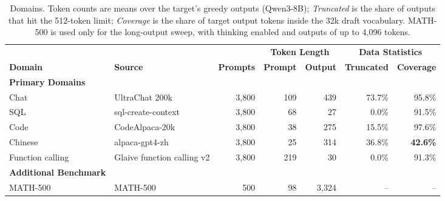 \documentclass{article}
\begin{document}
\begin{table}[!htbp]
\caption{Domains. Token counts are means over the target's greedy outputs (Qwen3-8B); \emph{Truncated} is the share of outputs that hit the 512-token limit; \emph{Coverage} is the share of target output tokens inside the 32k draft vocabulary. MATH-500 is used only for the long-output sweep, with thinking enabled and outputs of up to 4{,}096 tokens.}
\label{tab:workloads}
\centering\footnotesize\setlength{\tabcolsep}{4pt}

\begingroup
\renewcommand{\arraystretch}{1.18}
\setlength{\tabcolsep}{3.5pt}

\begin{tabularx}{\linewidth}{@{}
    l
    >{\raggedright\arraybackslash}X
    rrrrr@{}}
\toprule

&
&
&
\multicolumn{2}{c}{\textbf{Token Length}}
&
\multicolumn{2}{c}{\textbf{Data Statistics}} \\

\cmidrule(lr){4-5}
\cmidrule(l){6-7}

\textbf{Domain}
& \textbf{Source}
& \textbf{Prompts}
& \textbf{Prompt}
& \textbf{Output}
& \textbf{Truncated}
& \textbf{Coverage} \\

\midrule

\rowcolor{tabGroup}
\textbf{\footnotesize Primary Domains}
& & & & & & \\

Chat
& UltraChat 200k \citep{ding2023ultrachat}
& 3{,}800
& 109
& 439
& 73.7\%
& 95.8\% \\

SQL
& sql-create-context \citep{sqlcreatecontext}
& 3{,}800
& 68
& 27
& 0.0\%
& 91.5\% \\

Code
& CodeAlpaca-20k \citep{codealpaca}
& 3{,}800
& 38
& 275
& 15.5\%
& 97.6\% \\

Chinese
& alpaca-gpt4-zh \citep{peng2023gpt4instruct}
& 3{,}800
& 25
& 314
& 36.8\%
& \cellcolor{tabHighlight}\textbf{42.6\%} \\

Function calling
& Glaive function calling v2 \citep{glaivefc}
& 3{,}800
& 219
& 30
& 0.0\%
& 91.3\% \\

\addlinespace[3pt]

\rowcolor{tabGroup}
\textbf{\footnotesize Additional Benchmark}
& & & & & & \\

MATH-500
& MATH-500 \citep{lightman2023verify}
& 500
& 98
& 3{,}324
& --
& -- \\

\bottomrule
\end{tabularx}
\endgroup

\end{table}
\end{document}
